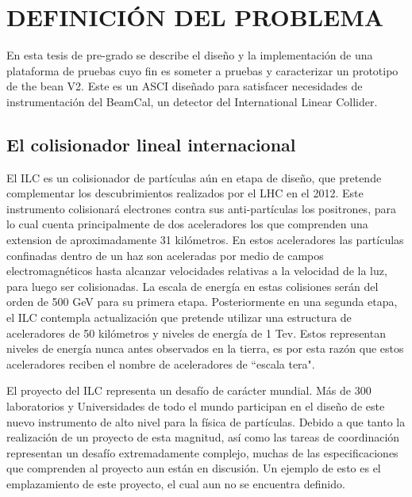 \chapter{DEFINICIÓN DEL PROBLEMA}
\label{chapter:problem}
En esta tesis de pre-grado se describe el diseño y la implementación de una plataforma de pruebas cuyo fin es someter a pruebas y caracterizar un prototipo de the bean V2. Este es un ASCI diseñado para satisfacer necesidades de instrumentación del BeamCal, un detector del International Linear Collider.

\section{El colisionador lineal internacional}
El ILC es un colisionador de partículas aún  en etapa de diseño, que pretende complementar los descubrimientos realizados por el LHC en el 2012. Este instrumento colisionará electrones contra sus  anti-partículas los positrones, para lo cual cuenta principalmente de dos aceleradores los que comprenden una extension de aproximadamente 31 kilómetros. En estos aceleradores las partículas confinadas dentro de un haz son aceleradas por medio de campos electromagnéticos hasta alcanzar velocidades relativas a la velocidad de la luz, para luego ser colisionadas. La escala de energía en estas colisiones serán del orden de 500 GeV para su primera etapa. Posteriormente en una segunda etapa, el ILC contempla actualización que pretende utilizar una estructura de aceleradores de 50 kilómetros y niveles de energía de 1 Tev. Estos representan niveles de energía nunca antes observados en la tierra, es por esta razón que estos aceleradores reciben el nombre de aceleradores de ``escala tera". 

El proyecto del ILC representa un desafío de carácter mundial. Más de 300 laboratorios y Universidades de todo el mundo participan en el diseño de este nuevo instrumento de alto nivel para la física de partículas.  Debido a que tanto la realización de un proyecto de esta magnitud, así como las tareas de coordinación representan un desafío extremadamente complejo, muchas de las especificaciones que comprenden al proyecto aun están en discusión. Un ejemplo de esto es el emplazamiento de este proyecto, el cual aun no se encuentra definido.



